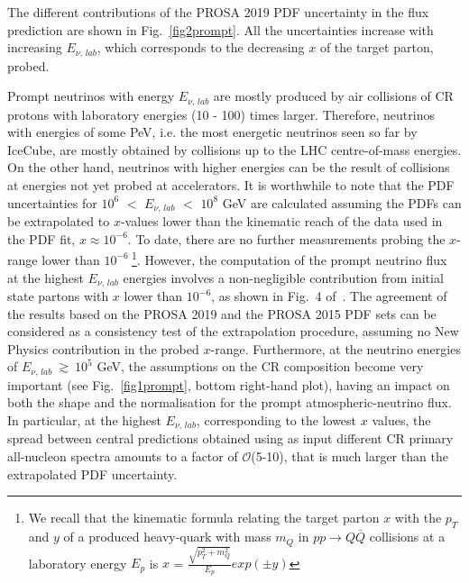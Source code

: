 \documentclass[12pt]{article}
\begin{document}
The different contributions of the PROSA 2019 PDF uncertainty in the flux prediction are shown in Fig.~\ref{fig2prompt}. All the uncertainties increase with increasing $E_{\nu,\,lab}$, which corresponds to the decreasing $x$ of the target parton, probed. 

Prompt neutrinos with energy $E_{\nu,\,lab}$ are mostly produced by air collisions of CR protons with laboratory energies (10 - 100) times larger. Therefore, neutrinos with energies of some PeV, i.e. the most energetic neutrinos seen so far by IceCube, are mostly obtained by collisions up to the LHC centre-of-mass energies. On the other hand, neutrinos with higher energies can be the result of collisions at energies not yet probed at accelerators. It is worthwhile to note that the PDF uncertainties for $10^6$ $<$ $E_{\nu,\,lab}$ $<$ $10^8$ GeV are calculated assuming the PDFs can be extrapolated to $x$-values lower than the kinematic reach of the data used in the PDF fit, $x \approx 10^{-6}$. To date, there are no further measurements probing the $x$-range lower than $10^{-6\,\,}$\footnote{We recall that the kinematic formula relating the target parton $x$ with the $p_T$ and $y$ of a produced heavy-quark with mass $m_Q$ in $pp \rightarrow Q\bar{Q}$ collisions at a laboratory energy $E_p$ is $x$ = $\frac{\sqrt{p_T^2 + m_Q^2}}{E_p}exp(\pm y)$}. However, the computation of the prompt neutrino flux at the highest $E_{\nu,\, lab}$ energies involves a non-negligible contribution from initial state partons with $x$ lower than $10^{-6}$, as shown in Fig.~4 of~\cite{Goncalves:2017lvq}.      
The agreement of the results based on the PROSA 2019 and the PROSA 2015 PDF sets can be considered as a consistency test of the extrapolation procedure, assuming no New Physics contribution in the probed $x$-range. Furthermore, at the neutrino energies of $E_{\nu,\,lab}~\gtrsim~10^5$ GeV, the assumptions on the CR composition become very important (see Fig.~\ref{fig1prompt}, bottom right-hand plot), having an impact on both the shape and the normalisation for the prompt atmospheric-neutrino flux. In particular, at the highest $E_{\nu,\, lab}$, corresponding to the lowest $x$ values, the spread between central predictions obtained using as input different CR primary all-nucleon spectra amounts to a factor of $\mathcal{O}$(5-10), that is much larger than the extrapolated PDF uncertainty.  
\end{document}
